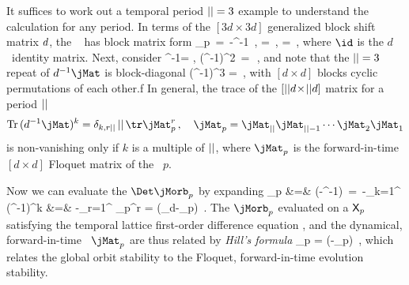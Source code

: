 It suffices to work out a temporal period ${||}=3$ example to understand
the calculation for any period. In terms of the $[3d\!\times\!3d]$
generalized  block shift matrix $d$, the \jacobianOrb\
 has block matrix form
\beq
\jMorb_p \,=\,
\id-\shift^{-1}\jMat
\,,\quad
\shift =
\,,\quad
\jMat =
\,,
where $\id  $ is the $d$\dmn\ identity matrix.
Next, consider
\beq
\shift^{-1}\jMat =
,\;\;
(\shift^{-1}\jMat)^2 \,=\,
\,,
and note that the ${||}=3$ repeat of $\shift^{-1}\jMat$ is block-diagonal
\bea
(\shift^{-1}\jMat)^3  =
\,,
\label{stabCube}
\eea
with $[d\!\times\!{d}]$ blocks cyclic permutations of each other.f
In general, %
the trace of the
$[{||}d\!\times\!{||}d]$ matrix for a period ${||}$ {\lattstate}
\[
\Tr(\shift^{-1}\jMat)^k=\delta_{k,r\cl{}}\,\cl{}\,\tr\jMat_p^r
\,,\quad
\jMat_p = \jMat_\cl{}\jMat_{\cl{}-1}\cdots\jMat_2\jMat_1
\]
is non-vanishing only if $k$ is a multiple of ${||}$, where $\jMat_p$ is the
for\-ward-in-time $[d\!\times\!{d}]$ Floquet matrix of the \po\ $p$.

Now we can evaluate the {\HillDet}
$\Det\jMorb_p$ by expanding
\bea
\ln\Det\jMorb_p &=&
\Tr\ln(\id-{\shift}^{-1}\jMat)
                \,=\,
-\sum_{k=1}^\infty{}\,\Tr({\shift}^{-1}\jMat)^k
    \continue
                 &=&
-\tr\sum_{r=1}^\infty{} \jMat_p^{r}
  =
\ln\det(\id_d-\jMat_p)
\,.
\label{LnDet=TrLn2}
\eea
The {\jacobianOrb} $\jMorb_p$ evaluated on a {\lattstate} $\mathsf{X}_p$
satisfying the temporal lattice first-order difference equation
, and the dynamical, for\-ward-in-time \jacobianM\
$\jMat_p$ are thus related by \emph{Hill's formula}
\beq
\Det\jMorb_p = \det(\id  -\jMat_p)
\,,
which relates the global orbit stability to the Floquet, for\-ward-in-time
evolution stability.

